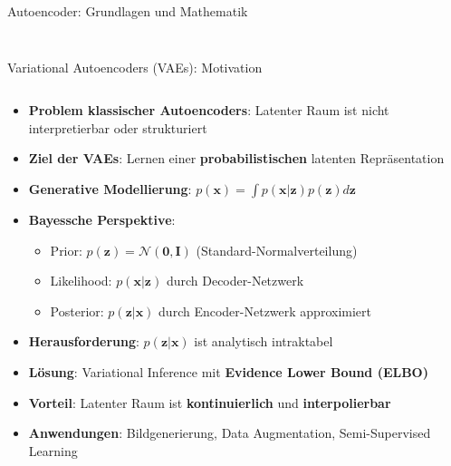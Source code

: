 \documentclass[aspectratio=1610, xcolor=dvipsnames, 9pt]{beamer}
\begin{document}
\begin{frame}{Autoencoder: Grundlagen und Mathematik}
\begin{columns}
\begin{column}{0.4\textwidth}
\begin{figure}
               \end{figure}
            \end{column}
        \end{columns}
      \end{frame}

\begin{frame}{Variational Autoencoders (VAEs): Motivation}
  \begin{columns}
    \begin{column}{1\textwidth}
      \begin{itemize}
        \item \textbf{Problem klassischer Autoencoders}: Latenter Raum ist nicht interpretierbar oder strukturiert
        \item \textbf{Ziel der VAEs}: Lernen einer \textbf{probabilistischen} latenten Repräsentation
        \item \textbf{Generative Modellierung}: $p(\mathbf{x}) = \int p(\mathbf{x}|\mathbf{z}) p(\mathbf{z}) d\mathbf{z}$
        \item \textbf{Bayessche Perspektive}:
        \begin{itemize}
          \item Prior: $p(\mathbf{z}) = \mathcal{N}(\mathbf{0}, \mathbf{I})$ (Standard-Normalverteilung)
          \item Likelihood: $p(\mathbf{x}|\mathbf{z})$ durch Decoder-Netzwerk
          \item Posterior: $p(\mathbf{z}|\mathbf{x})$ durch Encoder-Netzwerk approximiert
        \end{itemize}
        \item \textbf{Herausforderung}: $p(\mathbf{z}|\mathbf{x})$ ist analytisch intraktabel
        \item \textbf{Lösung}: Variational Inference mit \textbf{Evidence Lower Bound (ELBO)}
        \item \textbf{Vorteil}: Latenter Raum ist \textbf{kontinuierlich} und \textbf{interpolierbar}
        \item \textbf{Anwendungen}: Bildgenerierung, Data Augmentation, Semi-Supervised Learning
      \end{itemize}
    \end{column}
  \end{columns}
\end{frame}
\end{document}
